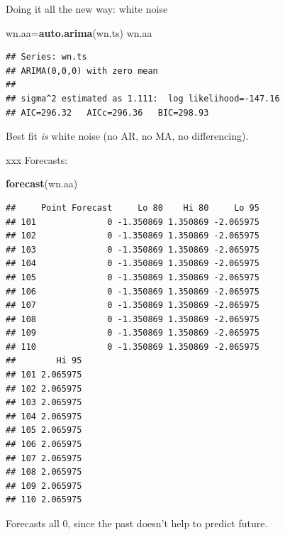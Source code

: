 \documentclass[ignorenonframetext,]{beamer}
\newenvironment{Shaded}{\begin{snugshade}}{\end{snugshade}}
\newcommand{\KeywordTok}[1]{\textcolor[rgb]{0.13,0.29,0.53}{\textbf{#1}}}
\newcommand{\NormalTok}[1]{#1}
\begin{document}
\begin{frame}[fragile]{Doing it all the new way: white noise}
\protect\hypertarget{doing-it-all-the-new-way-white-noise}{}

\begin{Shaded}
\begin{Highlighting}[]
\NormalTok{wn.aa=}\KeywordTok{auto.arima}\NormalTok{(wn.ts)}
\NormalTok{wn.aa}
\end{Highlighting}
\end{Shaded}

\begin{verbatim}
## Series: wn.ts 
## ARIMA(0,0,0) with zero mean 
## 
## sigma^2 estimated as 1.111:  log likelihood=-147.16
## AIC=296.32   AICc=296.36   BIC=298.93
\end{verbatim}

Best fit \emph{is} white noise (no AR, no MA, no differencing).

\end{frame}

\begin{frame}[fragile]{xxx Forecasts:}
\protect\hypertarget{xxx-forecasts}{}

\small

\begin{Shaded}
\begin{Highlighting}[]
\KeywordTok{forecast}\NormalTok{(wn.aa)}
\end{Highlighting}
\end{Shaded}

\begin{verbatim}
##     Point Forecast     Lo 80    Hi 80     Lo 95
## 101              0 -1.350869 1.350869 -2.065975
## 102              0 -1.350869 1.350869 -2.065975
## 103              0 -1.350869 1.350869 -2.065975
## 104              0 -1.350869 1.350869 -2.065975
## 105              0 -1.350869 1.350869 -2.065975
## 106              0 -1.350869 1.350869 -2.065975
## 107              0 -1.350869 1.350869 -2.065975
## 108              0 -1.350869 1.350869 -2.065975
## 109              0 -1.350869 1.350869 -2.065975
## 110              0 -1.350869 1.350869 -2.065975
##        Hi 95
## 101 2.065975
## 102 2.065975
## 103 2.065975
## 104 2.065975
## 105 2.065975
## 106 2.065975
## 107 2.065975
## 108 2.065975
## 109 2.065975
## 110 2.065975
\end{verbatim}

\normalsize

Forecasts all 0, since the past doesn't help to predict future.

\end{frame}
\end{document}
